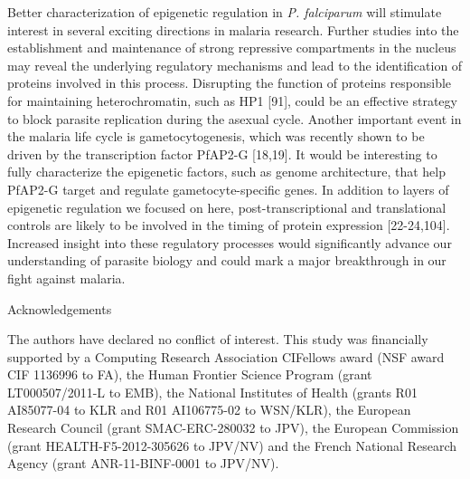 Better characterization of epigenetic regulation in \textit{P. falciparum} will
stimulate interest in several exciting directions in malaria research. Further
studies into the establishment and maintenance of strong repressive
compartments in the nucleus may reveal the underlying regulatory mechanisms
and lead to the identification of proteins involved in this process.
Disrupting the function of proteins responsible for maintaining
heterochromatin, such as HP1 \citep{brancucci:heterochromatin}
[91], could be an effective strategy to block
parasite replication during the asexual cycle. Another important event in the
malaria life cycle is gametocytogenesis, which was recently shown to be driven
by the transcription factor PfAP2-G \citep{kafsack:transcriptional,
sinha:cascade}[18,19]. It would be interesting to fully
characterize the epigenetic factors, such as genome architecture, that help
PfAP2-G target and regulate gametocyte-specific genes. In addition to layers
of epigenetic regulation we focused on here, post-transcriptional and
translational controls are likely to be involved in the timing of protein
expression \citep{suvorova:transcript, kramer:RNA, bunnik:polysomo,
leroch:global} [22-24,104].  Increased insight into these regulatory processes
would significantly advance our understanding of parasite biology and could
mark a major breakthrough in our fight against malaria.


Acknowledgements

The authors have declared no conflict of interest.
This study was financially supported by a Computing Research Association
CIFellows award (NSF award CIF 1136996 to FA), the Human Frontier Science
Program (grant LT000507/2011-L to EMB), the National Institutes of Health
(grants R01 AI85077-04 to KLR and R01 AI106775-02 to WSN/KLR), the European
Research Council (grant SMAC-ERC-280032 to JPV), the European Commission
(grant HEALTH-F5-2012-305626 to JPV/NV) and the French National Research
Agency (grant ANR-11-BINF-0001 to JPV/NV).

